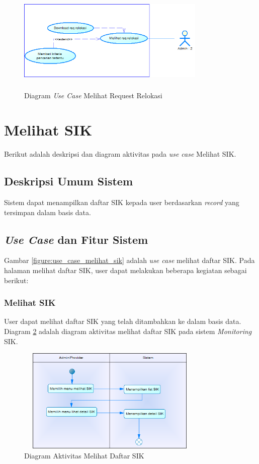 	\begin{figure}[h]
	\centerline
	{\includegraphics[width=9cm,height=5cm]{bab4/use-case-melihat-req-relokasi.png}}
	\caption{Diagram \textit{Use Case} Melihat Request Relokasi}
	\label{figure:use_case_melihat_req_relokasi}
	\end{figure}

\section{Melihat SIK}
Berikut adalah deskripsi dan diagram aktivitas pada \textit{use case} Melihat SIK.
\subsection{Deskripsi Umum Sistem}
\tab Sistem dapat menampilkan daftar SIK kepada user berdasarkan \textit{record} yang tersimpan dalam basis data.
\subsection{\textit{Use Case} dan Fitur Sistem}
Gambar \ref{figure:use_case_melihat_sik} adalah \textit{use case} melihat daftar SIK. Pada halaman melihat daftar SIK, user dapat melakukan beberapa kegiatan sebagai berikut:
	\subsubsection{Melihat SIK}
	User dapat melihat daftar SIK yang telah ditambahkan ke dalam basis data. Diagram \ref{figure:activity_melihat_sik} adalah diagram aktivitas melihat daftar SIK pada sistem \textit{Monitoring} SIK.
	\begin{figure}[h]
	\centerline {\includegraphics[width=9cm,height=5cm]{bab4/ActivityDiagram_MelihatSIK.png}}
	\caption{Diagram Aktivitas Melihat Daftar SIK}
	\label{figure:activity_melihat_sik}
	\end{figure}
	
